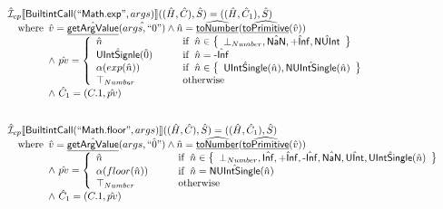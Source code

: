 \documentclass{article}
\newcommand{\SF}[1]{\mbox{\textsf{#1}}}
\newcommand{\wherec}[1]{{\rm where}\begin{array}[t]{l}#1\end{array}}
\newcommand{\ifc}[1]{{\rm if}\begin{array}[t]{l}#1\end{array}}
\newcommand{\owc}{{\rm otherwise}}
\newcommand{\aI}{\hat{\mathcal{I}}}
\newcommand{\set}[1]{\left\{\begin{array}{l}#1\end{array}\right\}}
\newcommand{\lbr}{\llbracket}
\newcommand{\rbr}{\rrbracket}
\newcommand{\hf}[1]{\underline{\sf #1}}
\newcommand{\ahf}[1]{\widehat{\underline{\sf #1}}}
\begin{document}
\[
\begin{array}{l}
\aI _{cp}\lbr \SF{BuiltintCall}(``\SF{Math.exp}",args)\rbr((\hat{H},\hat{C}), \hat{S})
  = ((\hat{H}, \hat{C}_1), \hat{S})\\
\quad\wherec{
  \hat{v}=\hat{\hf{getArgValue}}(\hat{args, ``0"}) \land \hat{n}=\ahf{toNumber}(\ahf{toPrimitive}(\hat{v}))\\
  \land\ \hat{pv}   = 
  \left\{
    \begin{array}{l@{\quad\quad\quad}l}
      \hat{n} & \ifc{\hat{n} \in \set{\bot_{Number}, \hat{\SF{NaN}}, \hat{\SF{+Inf}}, \hat{\SF{NUInt}}}}\\
      \hat{\SF{UIntSignle}}(\hat{0}) & \ifc{\hat{n}=\hat{\SF{-Inf}}}\\
      \alpha(exp(\hat{n})) & \ifc{\hat{n} \in \set{\hat{\SF{UIntSingle}}(\hat{n}), \hat{\SF{NUIntSingle}}(\hat{n})}}\\
      \top_{Number} & \owc\\
    \end{array}
  \right.\\
  \land\ \hat{C}_1 = (C.1, \hat{pv})
  }\\
\\\\



\aI _{cp}\lbr \SF{BuiltintCall}(``\SF{Math.floor}",args)\rbr((\hat{H},\hat{C}), \hat{S})
  = ((\hat{H}, \hat{C}_1), \hat{S})\\
\quad\wherec{
  \hat{v}=\hat{\hf{getArgValue}}(args, \hat{``0"}) \land \hat{n}=\ahf{toNumber}(\ahf{toPrimitive}(\hat{v}))\\
  \land\ \hat{pv}   = 
  \left\{
    \begin{array}{l@{\quad\quad\quad}l}
      \hat{n} & \ifc{\hat{n} \in \set{\bot_{Number}, \hat{\SF{Inf}}, \hat{\SF{+Inf}}, \hat{\SF{-Inf}}, \hat{\SF{NaN}}, \hat{\SF{UInt}}, \hat{\SF{UIntSingle}}(\hat{n})}}\\
      \alpha(floor(\hat{n})) & \ifc{\hat{n} = \hat{\SF{NUIntSingle}}(\hat{n})}\\
      \top_{Number} & \owc\\
    \end{array}
  \right.\\
  \land\ \hat{C}_1 = (C.1, \hat{pv})
  }\\
\\\\




\end{array}\]
\end{document}
